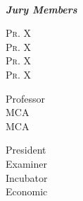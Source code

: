 \begin{titlepage}
\begin{center}
\begin{minipage}{0.4\textwidth}
		\end{minipage}\\[1cm]
		\begin{minipage}[c]{0.8\textwidth}
			\begin{flushleft}
				\emph{\textbf{Jury Members}}\\[0.4cm]
				\begin{minipage}{0.3\textwidth}
					\textsc{Pr. X}\\
					\textsc{Pr. X}\\
					\textsc{Pr. X}\\
					\textsc{Pr. X}
				\end{minipage}
				\begin{minipage}{0.3\textwidth}
					Professor\\
					MCA\\
					MCA\\
				\end{minipage}
				\begin{minipage}{0.3\textwidth}
					President\\
					Examiner\\
					Incubator\\
					Economic
				\end{minipage}
			\end{flushleft}
		\end{minipage}
		\vfill
		\@date
	\end{center}
\end{titlepage}

